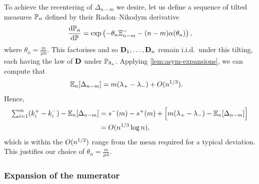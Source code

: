 To achieve the recentering of $\Delta_{n-m}$ we desire, let us define a sequence of tilted measures $\P_n$ defined by their Radon--Nikodym derivative
\begin{equation}
    \diff{\P_n}{\P} = \exp \left( - \theta_n \Xi^-_{n-m} - (n - m) \alpha(\theta_n) \right),
\end{equation}
where $\theta_n = \frac{m}{\mu n}$. This factorises and so $\vD_1, \ldots, \vD_n$ remain i.i.d.\ under this tilting, each having the law of $\vD$ under $\P_{\theta_n}$. Applying \cref{lem:asym-expansions}, we can compute that
\begin{align*}
    \E_n[\Delta_{n-m}] 
    &= m(\lambda_+ - \lambda_-) + \bigo(n^{1/3}).
\end{align*}
Hence,
\begin{align*}
    \textstyle \sum_{i=1}^m (k_i^+ - k_i^-) - \E_n[\Delta_{n-m}] 
    &= s^-(m) - s^+(m) + \Big[ m(\lambda_+ - \lambda_-) - \E_n[\Delta_{n-m}] \Big] \\
    &= \bigo(n^{1/3} \log n),
\end{align*}
which is within the $\bigo(n^{1/2})$ range from the mean required for a typical deviation. This justifies our choice of $\theta_n = \frac{m}{\mu n}$. 

\subsubsection{Expansion of the numerator}

